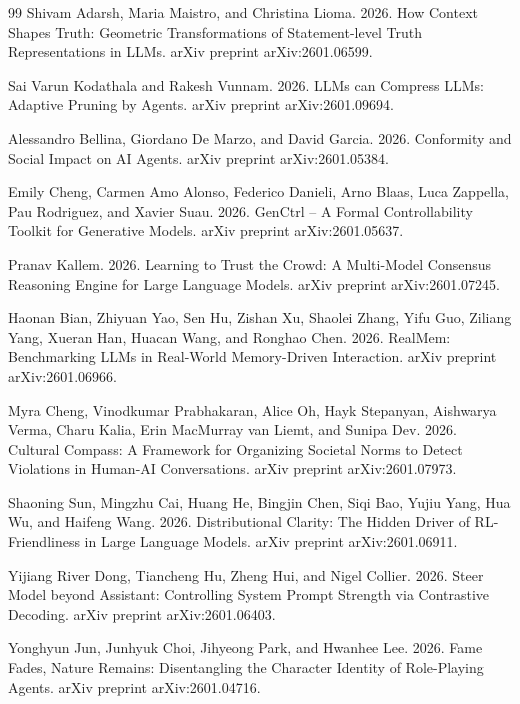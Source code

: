 \documentclass{article}
\begin{document}
\begin{thebibliography}{99}
Shivam Adarsh, Maria Maistro, and Christina Lioma. 2026. How Context Shapes Truth: Geometric Transformations of Statement-level Truth Representations in LLMs. arXiv preprint arXiv:2601.06599.

Sai Varun Kodathala and Rakesh Vunnam. 2026. LLMs can Compress LLMs: Adaptive Pruning by Agents. arXiv preprint arXiv:2601.09694.

Alessandro Bellina, Giordano De Marzo, and David Garcia. 2026. Conformity and Social Impact on AI Agents. arXiv preprint arXiv:2601.05384.

Emily Cheng, Carmen Amo Alonso, Federico Danieli, Arno Blaas, Luca Zappella, Pau Rodriguez, and Xavier Suau. 2026. GenCtrl -- A Formal Controllability Toolkit for Generative Models. arXiv preprint arXiv:2601.05637.

Pranav Kallem. 2026. Learning to Trust the Crowd: A Multi-Model Consensus Reasoning Engine for Large Language Models. arXiv preprint arXiv:2601.07245.

Haonan Bian, Zhiyuan Yao, Sen Hu, Zishan Xu, Shaolei Zhang, Yifu Guo, Ziliang Yang, Xueran Han, Huacan Wang, and Ronghao Chen. 2026. RealMem: Benchmarking LLMs in Real-World Memory-Driven Interaction. arXiv preprint arXiv:2601.06966.

Myra Cheng, Vinodkumar Prabhakaran, Alice Oh, Hayk Stepanyan, Aishwarya Verma, Charu Kalia, Erin MacMurray van Liemt, and Sunipa Dev. 2026. Cultural Compass: A Framework for Organizing Societal Norms to Detect Violations in Human-AI Conversations. arXiv preprint arXiv:2601.07973.

Shaoning Sun, Mingzhu Cai, Huang He, Bingjin Chen, Siqi Bao, Yujiu Yang, Hua Wu, and Haifeng Wang. 2026. Distributional Clarity: The Hidden Driver of RL-Friendliness in Large Language Models. arXiv preprint arXiv:2601.06911.

Yijiang River Dong, Tiancheng Hu, Zheng Hui, and Nigel Collier. 2026. Steer Model beyond Assistant: Controlling System Prompt Strength via Contrastive Decoding. arXiv preprint arXiv:2601.06403.

Yonghyun Jun, Junhyuk Choi, Jihyeong Park, and Hwanhee Lee. 2026. Fame Fades, Nature Remains: Disentangling the Character Identity of Role-Playing Agents. arXiv preprint arXiv:2601.04716.


\end{thebibliography}
\end{document}
